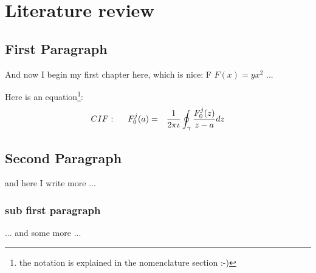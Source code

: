 \chapter{Literature review}

\ifpdf
    \graphicspath{{Chapter2_LitReview/Chapter2Figs/PNG/}{Chapter2_LitReview/Chapter2Figs/PDF/}{Chapter2_LitReview/Chapter2Figs/}}
\else
    \graphicspath{{Chapter2_LitReview/Chapter2Figs/EPS/}{Chapter2_LitReview/Chapter2Figs/}}
\fi

\section{First Paragraph}
And now I begin my first chapter here, which is nice: F $F(x) = y x^2$ ...

Here is an equation\footnote{the notation is explained in the nomenclature section :-)}:
\begin{eqnarray}
CIF: \hspace*{5mm}F_0^j(a) &=& \frac{1}{2\pi \iota} \oint_{\gamma} \frac{F_0^j(z)}{z - a} dz
\end{eqnarray}
\nomenclature[gp]{$\pi$}{ $\simeq 3.14\ldots$}                                             %

\section{Second Paragraph}
and here I write more ...

\subsection{sub first paragraph}
... and some more ...

